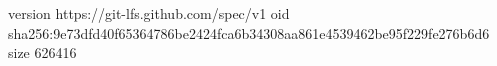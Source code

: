 version https://git-lfs.github.com/spec/v1
oid sha256:9e73dfd40f65364786be2424fca6b34308aa861e4539462be95f229fe276b6d6
size 626416
